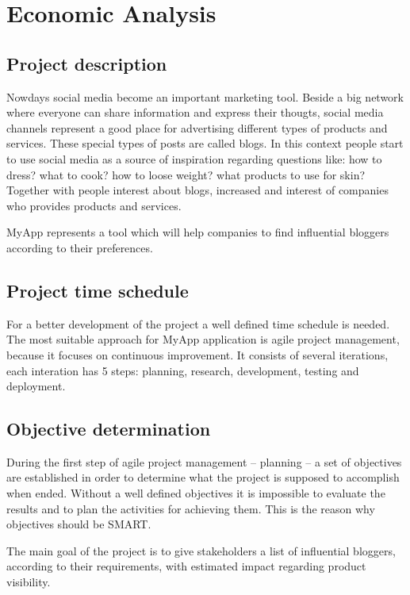 \section{Economic Analysis}

\subsection{Project description}

Nowdays social media become an important marketing tool. Beside a big network where everyone can share information and express their thougts, social media channels represent a good place for advertising different types of products and services. These special types of posts are called blogs. In this context people start to use social media as a source of inspiration regarding questions like: how to dress? what to cook? how to loose weight? what products to use for skin? Together with people interest about blogs, increased and interest of companies who provides products and services.

MyApp represents a tool which will help companies to find influential bloggers according to their preferences.

\subsection{Project time schedule}

For a better development of the project a well defined time schedule is needed. The most suitable approach for MyApp application is agile project management, because it focuses on continuous improvement. It consists of several iterations, each interation has 5 steps: planning, research, development, testing and deployment.

\subsection{Objective determination}

During the first step of agile project management -- planning -- a set of objectives are established in order to determine what the project is supposed to accomplish when ended. Without a well defined objectives it is impossible to evaluate the results and to plan the activities for achieving them. This is the reason why objectives should be SMART. 

The main goal of the project is to give stakeholders a list of influential bloggers, according to their requirements, with estimated impact regarding product visibility.

